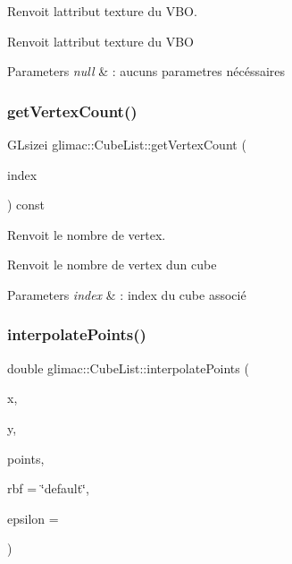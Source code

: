 Renvoit l\textquotesingle{}attribut texture du V\+BO. 

Renvoit l\textquotesingle{}attribut texture du V\+BO


\begin{DoxyParams}{Parameters}
{\em null} & \+: aucuns parametres nécéssaires \\
\hline
\end{DoxyParams}
\mbox{\label{classglimac_1_1CubeList_a5f1ea621736982934d8672771d42406f}} 
\subsubsection{\texorpdfstring{get\+Vertex\+Count()}{getVertexCount()}}
{\footnotesize\ttfamily G\+Lsizei glimac\+::\+Cube\+List\+::get\+Vertex\+Count (\begin{DoxyParamCaption}\item[{int}]{index }\end{DoxyParamCaption}) const\hspace{0.3cm}{\ttfamily [inline]}}



Renvoit le nombre de vertex. 

Renvoit le nombre de vertex d\textquotesingle{}un cube


\begin{DoxyParams}{Parameters}
{\em index} & \+: index du cube associé \\
\hline
\end{DoxyParams}
\mbox{\label{classglimac_1_1CubeList_ac4b12134064f67c17192b9c81796792e}} 
\subsubsection{\texorpdfstring{interpolate\+Points()}{interpolatePoints()}}
{\footnotesize\ttfamily double glimac\+::\+Cube\+List\+::interpolate\+Points (\begin{DoxyParamCaption}\item[{double}]{x,  }\item[{double}]{y,  }\item[{Eigen\+::\+Matrix\+Xd}]{points,  }\item[{std\+::string}]{rbf = {\ttfamily \char`\"{}default\char`\"{}},  }\item[{float}]{epsilon = {} }\end{DoxyParamCaption})}



